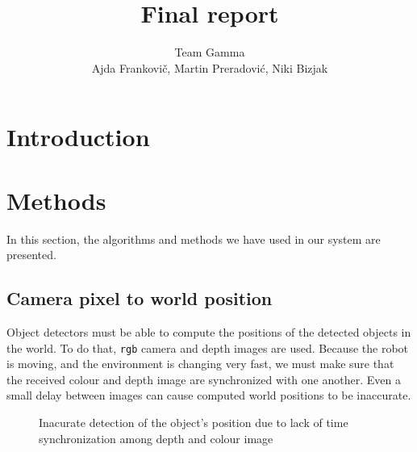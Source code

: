 \documentclass[12pt,a4paper]{article}
\author{Team Gamma \\ {\small Ajda Frankovič, Martin Preradović, Niki Bizjak}}
\title{Final report}
\date{}
\begin{document}
	
	\maketitle
	
	\section{Introduction}
	
	\section{Methods} \label{methods}
	In this section, the algorithms and methods we have used in our system are presented.

	
	\subsection{Camera pixel to world position} \label{pixel_to_world}
	Object detectors must be able to compute the positions of the detected objects in the world. To do that, \texttt{rgb} camera and depth images are used. Because the robot is moving, and the environment is changing very fast, we must make sure that the received colour and depth image are synchronized with one another. Even a small delay between images can cause computed world positions to be inaccurate. \\ 

	\begin{figure}[h]
		\centering
		\caption{Inacurate detection of the object's position due to lack of time synchronization among depth and colour image}
		\label{fig:non_synchronized_raw_detection}
	\end{figure}
	
\end{document}
